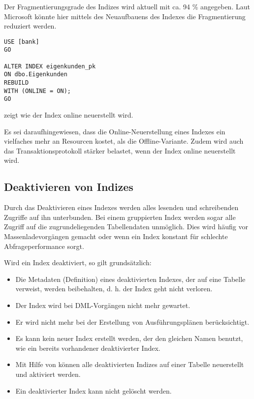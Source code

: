           Der Fragmentierungsgrade des Indizes 
          wird aktuell mit ca. 94 \% angegeben. Laut Microsoft könnte hier
          mittels des Neuaufbauens des Indexes die Fragmentierung reduziert
          werden.
          \begin{lstlisting}[language=ms_sql, caption={Den Index
          \identifier{eigenkunden\_pk} neuerstellen}, label=admin05_14]
USE [bank]
GO

ALTER INDEX eigenkunden_pk
ON dbo.Eigenkunden
REBUILD
WITH (ONLINE = ON);
GO
          \end{lstlisting}
           zeigt wie der Index 
          online neuerstellt wird.
          \begin{merke}
            Es sei daraufhingewiesen, dass die Online-Neuerstellung eines
            Indexes ein vielfaches mehr an Resourcen kostet, als die
            Offline-Variante. Zudem wird auch das Transaktionsprotokoll stärker
            belastet, wenn der Index online neuerstellt wird.
          \end{merke}
          \begin{literaturinternet}
            \item \cite{ms189858}
            \item \cite{mssRSSiutOo}
          \end{literaturinternet}
\clearpage
      \subsection{Deaktivieren von Indizes}
        Durch das Deaktivieren eines Indexes werden alles lesenden und
        schreibenden Zugriffe auf ihn unterbunden. Bei einem gruppierten
        Index werden sogar alle Zugriff auf die zugrundeliegenden
        Tabellendaten unmöglich. Dies wird häufig vor Massenladevorgängen
        gemacht oder wenn ein Index konstant für schlechte Abfrageperformance
        sorgt.
        
        Wird ein Index deaktiviert, so gilt grundsätzlich:
        \begin{itemize}
            \item Die Metadaten (Definition) eines deaktivierten Indexes, der
            auf eine Tabelle verweist, werden beibehalten, d. h. der Index geht
            nicht verloren.
            \item Der Index wird bei DML-Vorgängen nicht mehr gewartet.
            \item Er wird nicht mehr bei der Erstellung von Ausführungsplänen
            berücksichtigt.
            \item Es kann kein neuer Index erstellt werden, der den gleichen
            Namen benutzt, wie ein bereits vorhandener deaktivierter Index.
            \item Mit Hilfe von  können
            alle deaktivierten Indizes auf einer Tabelle neuerstellt und
            aktiviert werden.
            \item Ein deaktivierter Index kann nicht gelöscht werden.
        \end{itemize}
